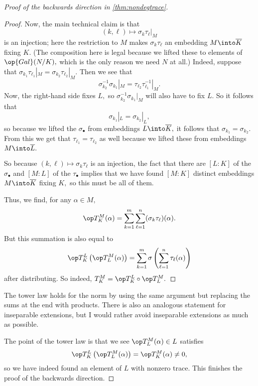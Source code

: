 \begin{proof}[Proof of the backwards direction in \autoref{thm:nondegtrace}]
\begin{proof}
		Now, the main technical claim is that
		\[(k,\ell)\mapsto\sigma_k\tau_\ell|_M\]
		is an injection; here the restriction to $M$ makes $\sigma_k\tau_\ell$ an embedding $M\into\overline K$ fixing $K.$ (The composition here is legal because we lifted these to elements of $\op{Gal}(N/K),$ which is the only reason we need $N$ at all.) Indeed, suppose that $\sigma_{k_1}\tau_{\ell_1}|_M=\sigma_{k_2}\tau_{\ell_2}|_M.$ Then we see that
		\[\sigma_{k_2}^{-1}\sigma_{k_1}|
		_M=\tau_{\ell_2}\tau_{\ell_1}^{-1}|_M.\]
		Now, the right-hand side fixes $L,$ so $\sigma_{k_2}^{-1}\sigma_{k_1}|_M$ will also have to fix $L.$ So it follows that
		\[\sigma_{k_1}|_L=\sigma_{k_2}|_L,\]
		so because we lifted the $\sigma_\bullet$ from embeddings $L\into\overline K,$ it follows that $\sigma_{k_1}=\sigma_{k_2}.$ From this we get that $\tau_{\ell_1}=\tau_{\ell_2}$ as well because we lifted these from embeddings $M\into\overline L.$

		So because $(k,\ell)\mapsto\sigma_k\tau_\ell$ is an injection, the fact that there are $[L:K]$ of the $\sigma_\bullet$ and $[M:L]$ of the $\tau_\bullet$ implies that we have found $[M:K]$ distinct embeddings $M\into\overline K$ fixing $K,$ so this must be all of them.
		
		Thus, we find, for any $\alpha\in M,$
		\[\op T^M_K(\alpha)=\sum_{k=1}^m\sum_{\ell=1}^n(\sigma_k\tau_\ell)(\alpha).\]
		But this summation is also equal to
		\[\op T^L_K\left(\op T^M_L(\alpha)\right)=\sum_{k=1}^m\sigma\left(\sum_{\ell=1}^n\tau_\ell(\alpha)\right)\]
		after distributing. So indeed, $T^M_K=\op T^L_K\circ\op T^M_L.$
	\end{proof}
	\begin{remark}[Nir]
		The tower law holds for the norm by using the same argument but replacing the sums at the end with products. There is also an analogous statement for inseparable extensions, but I would rather avoid inseparable extensions as much as possible.
	\end{remark}
	The point of the tower law is that we see $\op T^M_L(\alpha)\in L$ satisfies
	\[\op T^L_K\left(\op T^M_L(\alpha)\right)=\op T^M_K(\alpha)\ne0,\]
	so we have indeed found an element of $L$ with nonzero trace. This finishes the proof of the backwards direction.
\end{proof}
